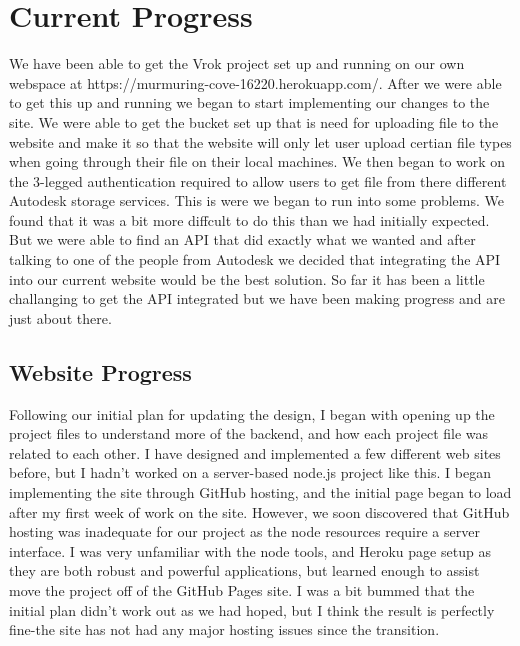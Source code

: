 \documentclass[10pt,draftclsnofoot,onecolumn]{IEEEtran}
\begin{document}
\section{Current Progress}
We have been able to get the Vrok project set up and running on our own webspace at https://murmuring-cove-16220.herokuapp.com/. After we were able to get this up and running we began to start implementing our changes to the site. We were able to get the bucket set up that is need for uploading file to the website and make it so that the website will only let user upload certian file types when going through their file on their local machines. We then began to work on the 3-legged authentication required to allow users to get file from there different Autodesk storage services. This is were we began to run into some problems. We found that it was a bit more diffcult to do this than we had initially expected. But we were able to find an API that did exactly what we wanted and after talking to one of the people from Autodesk we decided that integrating the API into our current website would be the best solution. So far it has been a little challanging to get the API integrated but we have been making progress and are just about there.

\subsection{Website Progress}
Following our initial plan for updating the design, I began with opening up the project files to understand more of the backend, and how each project file was related to each other. I have designed and implemented a few different web sites before, but I hadn't worked on a server-based node.js project like this. I began implementing the site through GitHub hosting, and the initial page began to load after my first week of work on the site. However, we soon discovered that GitHub hosting was inadequate for our project as the node resources require a server interface. I was very unfamiliar with the node tools, and Heroku page setup as they are both robust and powerful applications, but learned enough to assist move the project off of the GitHub Pages site. I was a bit bummed that the initial plan didn't work out as we had hoped, but I think the result is perfectly fine-the site has not had any major hosting issues since the transition.

\end{document}
